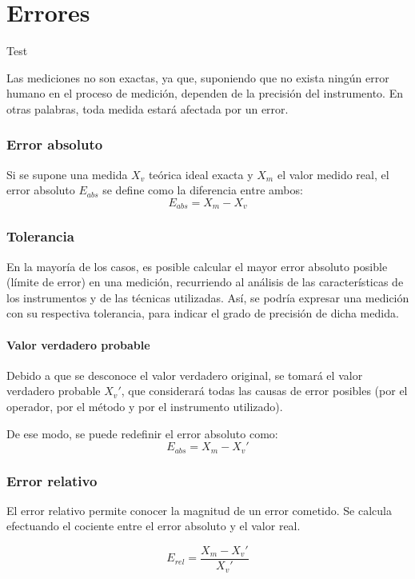 

\chapter{Errores}
\begin{ejemplo}
Test
\end{ejemplo}
Las mediciones no son exactas, ya que, suponiendo que no exista ningún error humano en el proceso de medición, dependen de la precisión del instrumento. En otras palabras, toda medida estará afectada por un error.

\subsection{Error absoluto}
Si se supone una medida $X_v$ teórica ideal exacta y $X_m$ el valor medido real, el error absoluto $E_{abs}$ se define como la diferencia entre ambos: $$ E_{abs}= X_m-X_v $$

\subsection{Tolerancia}
En la mayoría de los casos, es posible calcular el mayor error absoluto posible (límite de error) en una medición, recurriendo al análisis de las características de los instrumentos y de las técnicas utilizadas. Así, se podría expresar una medición con su respectiva tolerancia, para indicar el grado de precisión de dicha medida.


\subsubsection{Valor verdadero probable}
Debido a que se desconoce el valor verdadero original, se tomará el valor verdadero probable $X_v'$, que considerará todas las causas de error posibles (por el operador, por el método y por el instrumento utilizado).

De ese modo, se puede redefinir el error absoluto como: $$ E_{abs}= X_m-X_v' $$

\subsection{Error relativo}

El error relativo permite conocer la magnitud de un error cometido. Se calcula efectuando el cociente entre el error absoluto y el valor real.

$$ E_{rel} = \frac{X_m-X_v'}{X_v'} $$

